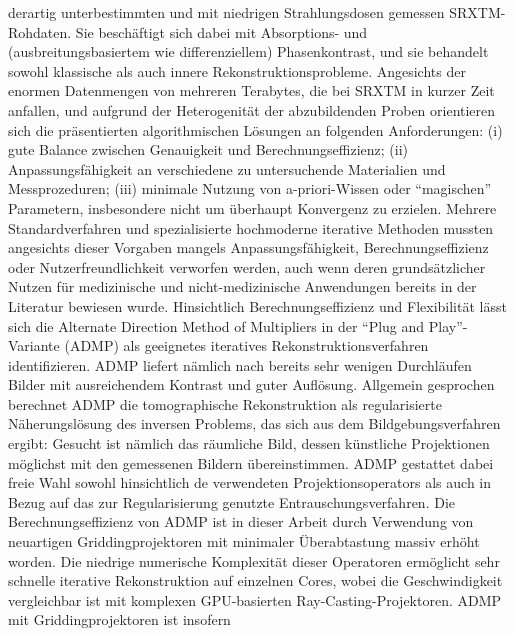 {derartig unterbestimmten und mit niedrigen Strahlungsdosen gemessen SRXTM-Rohdaten. Sie besch\"{a}ftigt sich dabei mit Absorptions- 
und (ausbreitungsbasiertem wie differenziellem) Phasenkontrast, und sie behandelt sowohl klassische als auch innere Rekonstruktionsprobleme.
Angesichts der enormen Datenmengen von mehreren Terabytes, die bei SRXTM in kurzer Zeit anfallen, und aufgrund der Heterogenit\"{a}t der 
abzubildenden Proben orientieren sich die pr\"{a}sentierten algorithmischen L\"{o}sungen an folgenden Anforderungen: (i) gute Balance zwischen
Genauigkeit und Berechnungseffizienz; (ii) Anpassungsf\"{a}higkeit an verschiedene zu untersuchende Materialien und Messprozeduren; 
(iii) minimale Nutzung von a-priori-Wissen oder ``magischen'' Parametern, insbesondere nicht um \"{u}berhaupt Konvergenz zu erzielen. 
Mehrere Standardverfahren und spezialisierte hochmoderne iterative Methoden mussten angesichts dieser Vorgaben mangels Anpassungsf\"{a}higkeit,
Berechnungseffizienz oder Nutzerfreundlichkeit verworfen werden, auch wenn deren grunds\"{a}tzlicher Nutzen f\"{u}r medizinische und
nicht-medizinische Anwendungen bereits in der Literatur bewiesen wurde.
\newline\newline
Hinsichtlich Berechnungseffizienz und Flexibilit\"{a}t l\"{a}sst sich die Alternate Direction Method of Multipliers in der ``Plug and Play''-Variante
(ADMP) als geeignetes iteratives Rekonstruktionsverfahren identifizieren. ADMP liefert n\"{a}mlich nach bereits sehr wenigen Durchl\"{a}ufen Bilder
mit ausreichendem Kontrast und guter Aufl\"{o}sung. Allgemein gesprochen berechnet ADMP die tomographische Rekonstruktion als regularisierte
N\"{a}herungsl\"{o}sung des inversen Problems, das sich aus dem Bildgebungsverfahren ergibt: Gesucht ist n\"{a}mlich das r\"{a}umliche Bild, dessen
k\"{u}nstliche Projektionen m\"{o}glichst mit den gemessenen Bildern \"{u}bereinstimmen. ADMP gestattet dabei freie Wahl sowohl hinsichtlich de
verwendeten Projektionsoperators als auch in Bezug auf das zur Regularisierung genutzte Entrauschungsverfahren.
\newline\newline
Die Berechnungseffizienz von ADMP ist in dieser Arbeit durch Verwendung von neuartigen Griddingprojektoren mit minimaler \"{U}berabtastung
massiv erh\"{o}ht worden. Die niedrige numerische Komplexit\"{a}t dieser Operatoren erm\"{o}glicht sehr schnelle iterative Rekonstruktion auf einzelnen
Cores, wobei die Geschwindigkeit vergleichbar ist mit komplexen GPU-basierten Ray-Casting-Projektoren. ADMP mit Griddingprojektoren ist insofern
}
